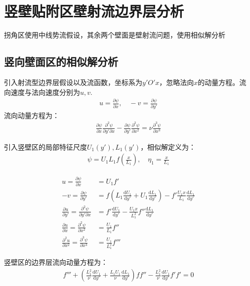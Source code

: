 
\section{竖壁贴附区壁射流边界层分析}

拐角区使用中线势流假设，其余两个壁面是壁射流问题，使用相似解分析



\subsection{竖向壁面区的相似解分析}
引入射流型边界层假设以及流函数，坐标系为$y'O'x$，忽略法向$x$的动量方程。流向速度与法向速度分别为$u,v$.
\begin{align}
    u=\frac{\partial \psi}{\partial x}, \quad -v=\frac{\partial \psi}{\partial y'}
\end{align}
流向动量方程为：
\begin{align}
     \frac{\partial \psi}{\partial x}\frac{\partial^{2} \psi}{\partial y'\partial x} - \frac{\partial \psi}{\partial y'}\frac{\partial^{2} \psi}{\partial x^{2}}=\nu\frac{\partial^{3} \psi}{\partial x^{3}}
\end{align}

引入竖壁区的局部特征尺度$U_{1}(y'),L_{1}(y')$，相似解定义为：
\begin{align}
    \psi=U_{1}L_{1}f(\frac{x}{L_{1}}), \quad \eta_{1}=\frac{x}{L_{1}}
\end{align}

\begin{align}
    u=\frac{\partial \psi}{\partial x}&=U_{1}f'\\
    -v=\frac{\partial \psi}{\partial y'}&=f\left(
    L_{1}\frac{\mathrm{d}U_{1}}{\mathrm{d}y'}+U_{1}\frac{\mathrm{d}L_{1}}{\mathrm{d}y'}
    \right)-f'\frac{U_{1}x}{L_{1}}\frac{\mathrm{d}L_{1}}{\mathrm{d}y'}\\
    \frac{\partial u}{\partial y'}=\frac{\partial^{2} \psi}{\partial y'\partial x}&=f'\frac{\mathrm{d}U_{1}}{\mathrm{d}y'}-
    \frac{U_{1}x}{L_{1}^{2}}f''\frac{\mathrm{d}L_{1}}{\mathrm{d}y'}\\
    \frac{\partial u}{\partial x}=\frac{\partial^{2} \psi}{\partial x^{2}}&=\frac{U_{1}}{L_{1}}f''\\
    \frac{\partial^{2} u}{\partial x^{2}}=\frac{\partial^{3} \psi}{\partial x^{3}}&=\frac{U_{1}}{L_{1}^{2}}f'''
\end{align}

竖壁区的边界层流向动量方程为：
\begin{align}
    \label{eq-ode-v-wall}
    f'''+\left(\frac{L_{1}^{2}}{\nu}\frac{\mathrm{d}U_{1}}{\mathrm{d}y'}+\frac{L_{1}U_{1}}{\nu}\frac{\mathrm{d}L_{1}}{\mathrm{d}y'}\right)ff''-\frac{L_{1}^{2}}{\nu}\frac{\mathrm{d}U_{1}}{\mathrm{d}y'}f'f'=0
\end{align}


